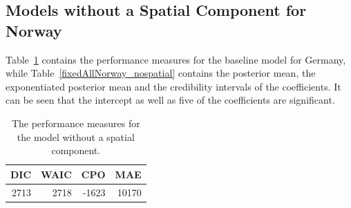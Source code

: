 \subsection{Models without a Spatial Component for Norway}\label{sec:nospatial_norway}
Table~\ref{allNorway_nospatial} contains the performance measures for the baseline model for Germany, while Table~\ref{fixedAllNorway_nospatial} contains the posterior mean, the exponentiated posterior mean and the credibility intervals of the coefficients. It can be seen that the intercept as well as five of the coefficients are significant.
\begin{table}[H] 
\caption{The performance measures for the model without a spatial component. \label{allNorway_nospatial}}
\begin{tabular}{r r r r}
\toprule\textbf{DIC}	& \textbf{WAIC} & \textbf{CPO} & \textbf{MAE}\\
\midrule
2713 & 2718 & -1623 & 10170 \\
\bottomrule
\end{tabular}
\end{table} 
